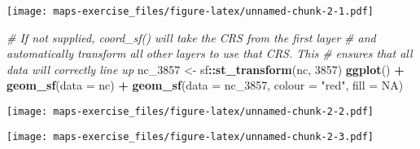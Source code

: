 \documentclass[
]{article}
\newenvironment{Shaded}{\begin{snugshade}}{\end{snugshade}}
\newcommand{\AttributeTok}[1]{\textcolor[rgb]{0.13,0.29,0.53}{#1}}
\newcommand{\CommentTok}[1]{\textcolor[rgb]{0.56,0.35,0.01}{\textit{#1}}}
\newcommand{\ConstantTok}[1]{\textcolor[rgb]{0.56,0.35,0.01}{#1}}
\newcommand{\DecValTok}[1]{\textcolor[rgb]{0.00,0.00,0.81}{#1}}
\newcommand{\FunctionTok}[1]{\textcolor[rgb]{0.13,0.29,0.53}{\textbf{#1}}}
\newcommand{\NormalTok}[1]{#1}
\newcommand{\OtherTok}[1]{\textcolor[rgb]{0.56,0.35,0.01}{#1}}
\newcommand{\SpecialCharTok}[1]{\textcolor[rgb]{0.81,0.36,0.00}{\textbf{#1}}}
\newcommand{\StringTok}[1]{\textcolor[rgb]{0.31,0.60,0.02}{#1}}
\begin{document}
\texttt{[image: maps-exercise\_files/figure-latex/unnamed-chunk-2-1.pdf]}

\begin{Shaded}
\begin{Highlighting}[]
\CommentTok{\# If not supplied, coord\_sf() will take the CRS from the first layer}
\CommentTok{\# and automatically transform all other layers to use that CRS. This}
\CommentTok{\# ensures that all data will correctly line up}
\NormalTok{nc\_3857 }\OtherTok{\textless{}{-}}\NormalTok{ sf}\SpecialCharTok{::}\FunctionTok{st\_transform}\NormalTok{(nc, }\DecValTok{3857}\NormalTok{)}
\FunctionTok{ggplot}\NormalTok{() }\SpecialCharTok{+}
  \FunctionTok{geom\_sf}\NormalTok{(}\AttributeTok{data =}\NormalTok{ nc) }\SpecialCharTok{+}
  \FunctionTok{geom\_sf}\NormalTok{(}\AttributeTok{data =}\NormalTok{ nc\_3857, }\AttributeTok{colour =} \StringTok{"red"}\NormalTok{, }\AttributeTok{fill =} \ConstantTok{NA}\NormalTok{)}
\end{Highlighting}
\end{Shaded}

\texttt{[image: maps-exercise\_files/figure-latex/unnamed-chunk-2-2.pdf]}

\begin{Shaded}
\end{Shaded}

\texttt{[image: maps-exercise\_files/figure-latex/unnamed-chunk-2-3.pdf]}
\end{document}
